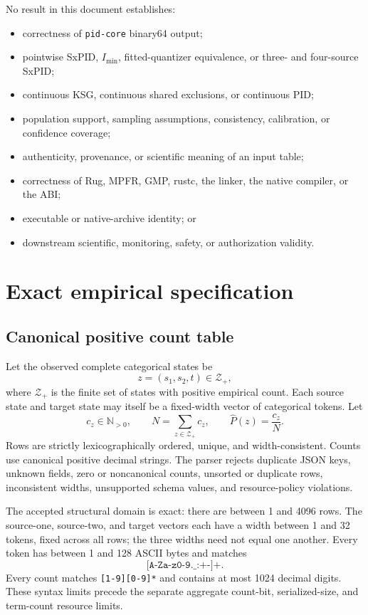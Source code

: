 \documentclass[11pt]{article}
\theoremstyle{definition}
\begin{document}
No result in this document establishes:
\begin{itemize}[leftmargin=*]
  \item correctness of \texttt{pid-core} binary64 output;
  \item pointwise SxPID, $I_{\min}$, fitted-quantizer equivalence, or three- and four-source SxPID;
  \item continuous KSG, continuous shared exclusions, or continuous PID;
  \item population support, sampling assumptions, consistency, calibration, or confidence
  coverage;
  \item authenticity, provenance, or scientific meaning of an input table;
  \item correctness of Rug, MPFR, GMP, rustc, the linker, the native compiler, or the ABI;
  \item executable or native-archive identity; or
  \item downstream scientific, monitoring, safety, or authorization validity.
\end{itemize}

\section{Exact empirical specification}

\subsection{Canonical positive count table}

Let the observed complete categorical states be
\begin{equation}
  z=(s_1,s_2,t)\in\mathcal{Z}_{+},
\end{equation}
where $\mathcal{Z}_{+}$ is the finite set of states with positive empirical count.  Each source
state and target state may itself be a fixed-width vector of categorical tokens.  Let
\begin{equation}
  c_z\in\mathbb{N}_{>0},
  \qquad
  N=\sum_{z\in\mathcal{Z}_{+}}c_z,
  \qquad
  \widehat P(z)=\frac{c_z}{N}.
\end{equation}
Rows are strictly lexicographically ordered, unique, and width-consistent.  Counts use canonical
positive decimal strings.  The parser rejects duplicate JSON keys, unknown fields, zero or
noncanonical counts, unsorted or duplicate rows, inconsistent widths, unsupported schema values,
and resource-policy violations.

The accepted structural domain is exact: there are between 1 and 4096 rows.  The source-one,
source-two, and target vectors each have a width between 1 and 32 tokens, fixed across all rows;
the three widths need not equal one another.  Every token has between 1 and 128 ASCII bytes and
matches
\begin{equation}
  \texttt{[A-Za-z0-9.\_:+-]+}.
\end{equation}
Every count matches \texttt{[1-9][0-9]*} and contains at most 1024 decimal digits.  These syntax
limits precede the separate aggregate count-bit, serialized-size, and term-count resource limits.
\end{document}

